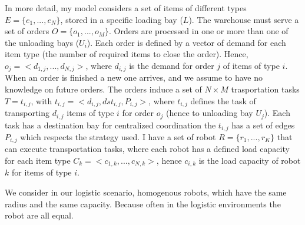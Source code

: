 In more detail, my model considers a set of items of different types $E = \{ e_1,...,e_N\}$,
stored in a specific loading bay ($L$). The warehouse must serve a set of orders 
$O=\{o_1,...,o_M\}$. Orders are processed in one or more than one of the unloading bays ($U_i$).
Each order is defined by a vector of demand for each item type (the number of required 
items to close the order). Hence, $o_j = < d_{1,j},...,d_{N,j}>$, where $d_{i,j}$ is the 
demand for order $j$ of items of type $i$. When an order is finished a new one arrives,
and we assume to have no knowledge on future orders.
The orders induce a set of $N \times M$ trasportation tasks $T = {t_{i,j}}$, with 
$t_{i,j} = < d_{i,j}, dst_{i,j}, P_{i,j}>$, where $t_{i,j}$ defines the task of transporting 
$d_{i,j}$ items of type $i$ for order $o_j$ (hence to unloading bay $U_j$).
Each task has a destination bay for centralized coordination the $t_{i,j}$ has a set of edges
$P_{i,j}$ which respects the strategy used. 
I have a set of robot $R = \{r_1,...,r_K \}$ that can execute transportation tasks, where
each robot has a defined load capacity for each item type $C_k = <c_{1,k},...,c_{N,k}>$, 
hence $c_{i,k}$ is the load capacity of robot $k$ for items of type $i$.

We consider in our logistic scenario, homogenous robots, which have the same radius 
and the same capacity. Because often in the logistic environments the robot are all 
equal. 



